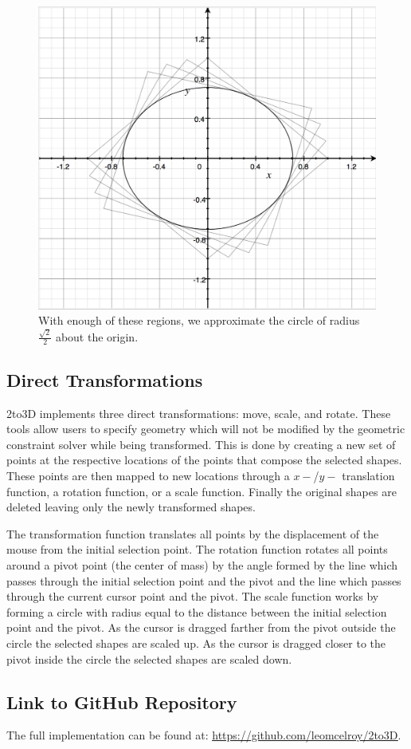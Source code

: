 \begin{figure}[H] 
\includegraphics[width=\linewidth]{dist3.png}
\caption{With enough of these regions, we approximate the circle of radius $\frac{\sqrt{2}}{2}$ about the origin.}
\label{dist3}
\end{figure}

\subsection*{Direct Transformations}

2to3D implements three direct transformations: move, scale, and rotate. These tools allow users to specify geometry which will not be modified by the geometric constraint solver while being transformed. This is done by creating a new set of points at the respective locations of the points that compose the selected shapes. These points are then mapped to new locations through a $x-$/$y-$ translation function, a rotation function, or a scale function. Finally the original shapes are deleted leaving only the newly transformed shapes.

The transformation function translates all points by the displacement of the mouse from the initial selection point. The rotation function rotates all points around a pivot point (the center of mass) by the angle formed by the line which passes through the initial selection point and the pivot and the line which passes through the current cursor point and the pivot. The scale function works by forming a circle with radius equal to the distance between the initial selection point and the pivot. As the cursor is dragged farther from the pivot outside the circle the selected shapes are scaled up. As the cursor is dragged closer to the pivot inside the circle the selected shapes are scaled down.

\subsection*{Link to GitHub Repository}

The full implementation can be found at: \newline \underline{\url{https://github.com/leomcelroy/2to3D}}.
